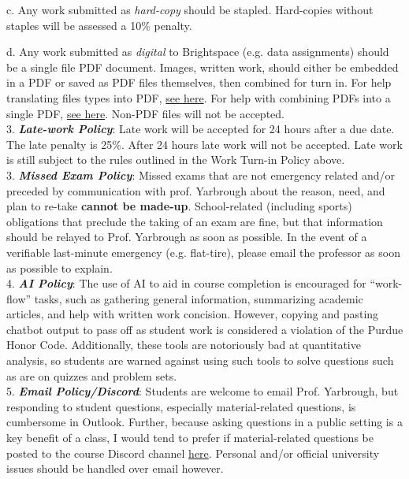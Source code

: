 \documentclass[11pt]{article}
\begin{document}
\hspace{0.25in} c. Any work submitted as \textit{hard-copy} should be stapled. Hard-copies without staples will be assessed a 10\% penalty. 

\hspace{0.25in} d. Any work submitted as \textit{digital} to Brightspace (e.g. data assignments) should be a single file PDF document. Images, written work, should either be embedded in a PDF or saved as PDF files themselves, then combined for turn in. For help translating files types into PDF, \href{https://acrobat.adobe.com/link/acrobat/jpg-to-pdf?x_api_client_id=adobe_com&x_api_client_location=jpg_to_pdf}{see here}. For help with combining PDFs into a single PDF, \href{https://acrobat.adobe.com/link/acrobat/combine-pdf?x_api_client_id=adobe_com&x_api_client_location=combine_pdf}{see here}. Non-PDF files will not be accepted.\\

3. \textbf{\textit{Late-work Policy}}: Late work will be accepted for 24 hours after a due date. The late penalty is 25\%. After 24 hours late work will not be accepted. Late work is still subject to the rules outlined in the Work Turn-in Policy above.\\

3. \textbf{\textit{Missed Exam Policy}}: Missed exams that are not emergency related and/or preceded by communication with prof. Yarbrough about the reason, need, and plan to re-take \textbf{cannot be made-up}. School-related (including sports) obligations that preclude the taking of an exam are fine, but that information should be relayed to Prof. Yarbrough as soon as possible. In the event of a verifiable last-minute emergency (e.g. flat-tire), please email the professor as soon as possible to explain. \\

4. \textbf{\textit{AI Policy}}: The use of AI to aid in course completion is encouraged for ``work-flow'' tasks, such as gathering general information, summarizing academic articles, and help with written work concision. However, copying and pasting chatbot output to pass off as student work is considered a violation of the Purdue Honor Code. Additionally, these tools are notoriously bad at quantitative analysis, so students are warned against using such tools to solve questions such as are on quizzes and problem sets.\\

5. \textbf{\textit{Email Policy/Discord}}: Students are welcome to email Prof. Yarbrough, but responding to student questions, especially material-related questions, is cumbersome in Outlook. Further, because asking questions in a public setting is a key benefit of a class, I would tend to prefer if material-related questions be posted to the course Discord channel \href{https://discord.gg/XpaaYxwjZK}{here}. Personal and/or official university issues should be handled over email however. \\
\end{document}

